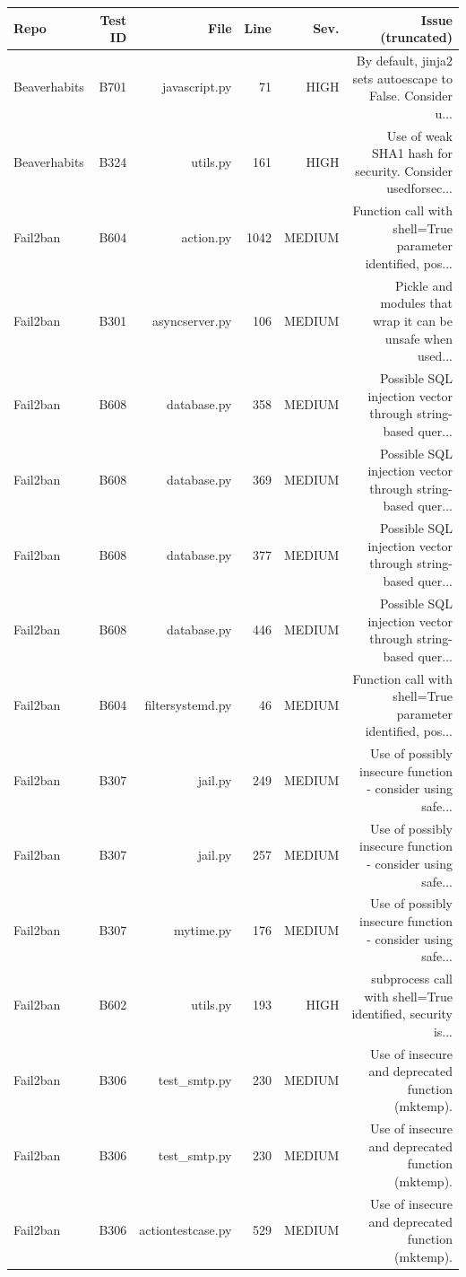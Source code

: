 \begin{table}[htbp]
\centering
\begin{tabular}{lrrrrr}
\hline
Repo & Test ID & File & Line & Sev. & Issue (truncated) \\
\hline
Beaverhabits & B701 & javascript.py & 71 & HIGH & By default, jinja2 sets autoescape to False. Consider u... \\
Beaverhabits & B324 & utils.py & 161 & HIGH & Use of weak SHA1 hash for security. Consider usedforsec... \\
Fail2ban & B604 & action.py & 1042 & MEDIUM & Function call with shell=True parameter identified, pos... \\
Fail2ban & B301 & asyncserver.py & 106 & MEDIUM & Pickle and modules that wrap it can be unsafe when used... \\
Fail2ban & B608 & database.py & 358 & MEDIUM & Possible SQL injection vector through string-based quer... \\
Fail2ban & B608 & database.py & 369 & MEDIUM & Possible SQL injection vector through string-based quer... \\
Fail2ban & B608 & database.py & 377 & MEDIUM & Possible SQL injection vector through string-based quer... \\
Fail2ban & B608 & database.py & 446 & MEDIUM & Possible SQL injection vector through string-based quer... \\
Fail2ban & B604 & filtersystemd.py & 46 & MEDIUM & Function call with shell=True parameter identified, pos... \\
Fail2ban & B307 & jail.py & 249 & MEDIUM & Use of possibly insecure function - consider using safe... \\
Fail2ban & B307 & jail.py & 257 & MEDIUM & Use of possibly insecure function - consider using safe... \\
Fail2ban & B307 & mytime.py & 176 & MEDIUM & Use of possibly insecure function - consider using safe... \\
Fail2ban & B602 & utils.py & 193 & HIGH & subprocess call with shell=True identified, security is... \\
Fail2ban & B306 & test_smtp.py & 230 & MEDIUM & Use of insecure and deprecated function (mktemp). \\
Fail2ban & B306 & test_smtp.py & 230 & MEDIUM & Use of insecure and deprecated function (mktemp). \\
Fail2ban & B306 & actiontestcase.py & 529 & MEDIUM & Use of insecure and deprecated function (mktemp). \\

\end{tabular}
\end{table}

